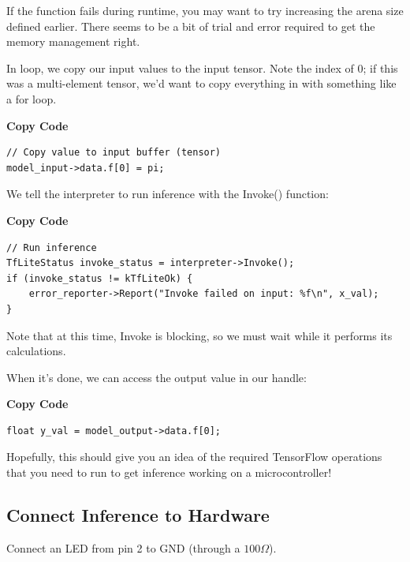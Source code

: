 If the  function fails during runtime, you may want to try increasing the arena size defined earlier. There seems to be a bit of trial and error required to get the memory management right.

In loop, we copy our input values to the input tensor. Note the index of 0; if this was a multi-element tensor, we’d want to copy everything in with something like a for loop.



\medskip

 \textbf{Copy Code}
 
\begin{lstlisting}
// Copy value to input buffer (tensor)
model_input->data.f[0] = pi;
\end{lstlisting}



We tell the interpreter to run inference with the Invoke() function:



\medskip

 \textbf{Copy Code}
 
\begin{lstlisting}
// Run inference
TfLiteStatus invoke_status = interpreter->Invoke();
if (invoke_status != kTfLiteOk) {
    error_reporter->Report("Invoke failed on input: %f\n", x_val);
}
\end{lstlisting}



Note that at this time, Invoke is blocking, so we must wait while it performs its calculations.

When it’s done, we can access the output value in our  handle:


\medskip

\textbf{Copy Code}

\begin{lstlisting}
float y_val = model_output->data.f[0];
\end{lstlisting}


Hopefully, this should give you an idea of the required TensorFlow operations that you need to run to get inference working on a microcontroller!

\subsection{Connect Inference to Hardware}


Connect an LED from pin 2 to GND (through a $100 \Omega$). 

